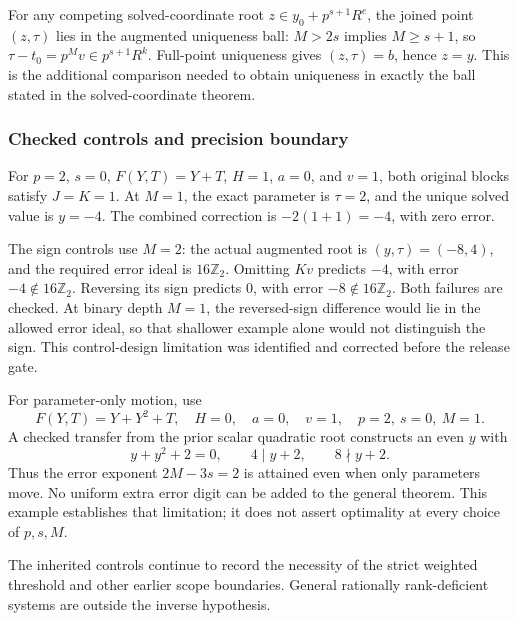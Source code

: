 For any competing solved-coordinate root \(z\in y_0+p^{s+1}R^e\), the
joined point \((z,\tau)\) lies in the augmented uniqueness ball:
\(M>2s\) implies \(M\ge s+1\), so \(\tau-t_0=p^Mv\in p^{s+1}R^k\).
Full-point uniqueness gives \((z,\tau)=b\), hence \(z=y\). This is the
additional comparison needed to obtain uniqueness in exactly the ball
stated in the solved-coordinate theorem.

\hypertarget{cont10:checked-controls-and-precision-boundary}{%
\subsubsection{Checked controls and precision
boundary}\label{cont10:checked-controls-and-precision-boundary}}

For \(p=2\), \(s=0\), \(F(Y,T)=Y+T\), \(H=1\), \(a=0\), and \(v=1\),
both original blocks satisfy \(J=K=1\). At \(M=1\), the exact parameter
is \(\tau=2\), and the unique solved value is \(y=-4\). The combined
correction is \(-2(1+1)=-4\), with zero error.

The sign controls use \(M=2\): the actual augmented root is
\((y,\tau)=(-8,4)\), and the required error ideal is \(16\mathbb Z_2\).
Omitting \(Kv\) predicts \(-4\), with error \(-4\notin16\mathbb Z_2\).
Reversing its sign predicts \(0\), with error \(-8\notin16\mathbb Z_2\).
Both failures are checked. At binary depth \(M=1\), the reversed-sign
difference would lie in the allowed error ideal, so that shallower
example alone would not distinguish the sign. This control-design
limitation was identified and corrected before the release gate.

For parameter-only motion, use \[
F(Y,T)=Y+Y^2+T,\quad H=0,\quad a=0,\quad v=1,\quad p=2,\ s=0,\ M=1.
\] A checked transfer from the prior scalar quadratic root constructs an
even \(y\) with \[
y+y^2+2=0,\qquad 4\mid y+2,\qquad 8\nmid y+2.
\] Thus the error exponent \(2M-3s=2\) is attained even when only
parameters move. No uniform extra error digit can be added to the
general theorem. This example establishes that limitation; it does not
assert optimality at every choice of \(p,s,M\).

The inherited controls continue to record the necessity of the strict
weighted threshold and other earlier scope boundaries. General
rationally rank-deficient systems are outside the inverse hypothesis.
